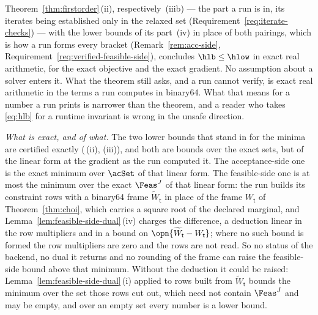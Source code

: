 \begin{remark}\label{rem:fo-arithmetic}
Theorem~\ref{thm:firstorder}\,(ii), respectively~(iiib) --- the part a
run is in, its iterates being established only in the relaxed set
(Requirement~\ref{req:iterate-checks}) --- with the lower bounds of its
part~(iv) in place of both pairings, which is how a run forms every bracket
(Remark~\ref{rem:acc-side}, Requirement~\ref{req:verified-feasible-side}),
concludes $\hlb\le\hlow$ in exact real arithmetic, for the exact objective
and the exact gradient. No assumption about a solver enters it. What the
theorem still asks, and a run cannot verify, is exact real arithmetic in
the terms a run computes in binary64. What that means for a number a run
prints is narrower than the theorem, and a reader who takes \eqref{eq:hlb}
for a runtime invariant is wrong in the unsafe direction.

\emph{What is exact, and of what.} The two lower bounds that stand in for
the minima are certified exactly
(\,(ii), (iii)), and both are bounds over
the exact sets, but of the linear form at the gradient as the run computed
it. The acceptance-side one is the exact minimum over $\acSet$ of that
linear form. The feasible-side one is at most the minimum over the exact
$\Feas^{J}$ of that linear form: the run builds its constraint rows with a
binary64 frame $\widetilde W_{\mathsf t}$ in place of the frame
$W_{\mathsf t}$ of Theorem~\ref{thm:choi}, which carries a square root of
the declared marginal, and Lemma~\ref{lem:feasible-side-dual}\,(iv) charges
the difference, a deduction linear in the row multipliers and in a bound on
$\opn{\widetilde W_{\mathsf t}-W_{\mathsf t}}$; where no such bound is
formed the row multipliers are zero and the rows are not read. So no status
of the backend, no dual it returns and no rounding of the frame can raise
the feasible-side bound above that minimum. Without the deduction it could
be raised: Lemma~\ref{lem:feasible-side-dual}\,(i) applied to rows built
from $\widetilde W_{\mathsf t}$ bounds the minimum over the set those rows
cut out, which need not contain $\Feas^{J}$ and may be empty, and over an
empty set every number is a lower bound.


\end{remark}
